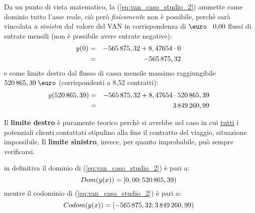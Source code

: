 \newline
Da un punto di vista matematico, la (\ref{eq:van_caso_studio_2}) ammette come dominio tutto l'asse reale, ciò però \textit{fisicamente} non è possibile, perchè sarà vincolata \textit{a sinistra} dal valore del VAN in corrispondenza di $\mbox{\euro \: 0,00}$ flussi di entrate mensili (non è possibile avere entrate negative):  
	\begin{eqnarray}
	\label{eq:limite_sinistro}
 		y(0) & = & -565\thinspace 875,32 + 8,47654 \cdot 0 \nonumber \\
 								& = & -565\thinspace 875,32
	\end{eqnarray}
e come limite destro dal flusso di cassa mensile massimo raggiungibile $520\thinspace 865,39 \: \mbox{\euro}$ (corrispondenti a 8,52 contratti):
	\begin{eqnarray}
	\label{eq:limite_superiore}
 		y(520\thinspace 865,39) & = & -565\thinspace 875,32 + 8,47654 \cdot 520\thinspace 865,39 \nonumber \\
 								& = & 3\thinspace 849\thinspace 260,99
	\end{eqnarray}
	
	\begin{tcolorbox}[colframe=blue!75!black,adjusted title=\textbf{Osservazione!}]
		Il \textbf{limite destro} è puramente teorico perchè si avrebbe nel caso in cui \underline{tutti} i potenziali clienti contattati stipulino alla fine il contratto del viaggio, situazione impossibile.
		\newline Il \textbf{limite sinistro}, invece, per quanto improbabile, può sempre verificarsi.
	\end{tcolorbox}	
in definitiva il dominio di (\ref{eq:van_caso_studio_2}) è pari a:
\[ Dom(y(x)) =	\left [ 0,00 ; 520\thinspace 865,39 \right)		\]
mentre il codominio di (\ref{eq:van_caso_studio_2}) è pari a:
\[ Codom(y(x)) =	\left [ -565\thinspace 875,32 ; 3\thinspace 849\thinspace 260,99 \right)		\]



